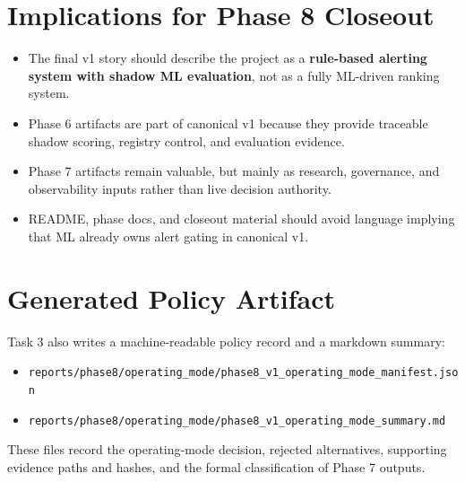 \documentclass{article}
\begin{document}
\section*{Implications for Phase 8 Closeout}
\begin{itemize}
\item The final v1 story should describe the project as a \textbf{rule-based alerting system with shadow ML evaluation}, not as a fully ML-driven ranking system.
\item Phase 6 artifacts are part of canonical v1 because they provide traceable shadow scoring, registry control, and evaluation evidence.
\item Phase 7 artifacts remain valuable, but mainly as research, governance, and observability inputs rather than live decision authority.
\item README, phase docs, and closeout material should avoid language implying that ML already owns alert gating in canonical v1.
\end{itemize}

\section*{Generated Policy Artifact}
Task 3 also writes a machine-readable policy record and a markdown summary:
\begin{itemize}
\item \texttt{reports/phase8/operating\_mode/phase8\_v1\_operating\_mode\_manifest.json}
\item \texttt{reports/phase8/operating\_mode/phase8\_v1\_operating\_mode\_summary.md}
\end{itemize}

These files record the operating-mode decision, rejected alternatives, supporting evidence paths and hashes, and the formal classification of Phase 7 outputs.
\end{document}
